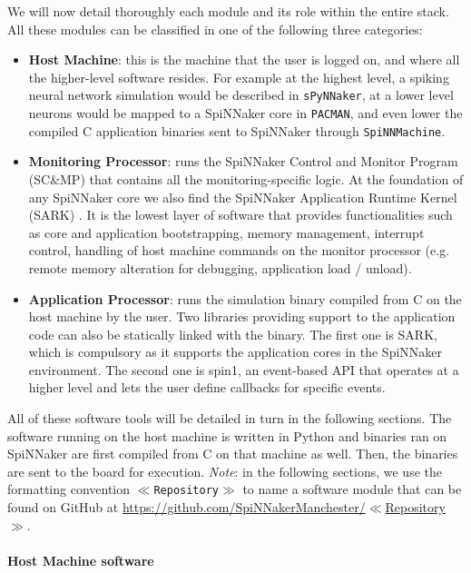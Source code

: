 We will now detail thoroughly each module and its role within the entire stack. All these modules can be classified in one of the following three categories:

\begin{itemize}
\item \textbf{Host Machine}: this is the machine that the user is logged on, and where all the higher-level software resides. For example at the highest level, a spiking neural network simulation would be described in \texttt{sPyNNaker}, at a lower level neurons would be mapped to a SpiNNaker core in \texttt{PACMAN}, and even lower the compiled C application binaries sent to SpiNNaker through \texttt{SpiNNMachine}.

\item \textbf{Monitoring Processor}: runs the SpiNNaker Control and Monitor Program (SC\&MP) \cite{spinnaker} that contains all the monitoring-specific logic. At the foundation of any SpiNNaker core we also find the SpiNNaker Application Runtime Kernel (SARK) \cite{sark}. It is the lowest layer of software that provides functionalities such as core and application bootstrapping, memory management, interrupt control, handling of host machine commands on the monitor processor (e.g. remote memory alteration for debugging, application load / unload).

\item \textbf{Application Processor}: runs the simulation binary compiled from C on the host machine by the user. Two libraries providing support to the application code can also be statically linked with the binary. The first one is SARK, which is compulsory as it supports the application cores in the SpiNNaker environment. The second one is spin1, an event-based API that operates at a higher level and lets the user define callbacks for specific events.
\end{itemize}

All of these software tools will be detailed in turn in the following sections. The software running on the host machine is written in Python and binaries ran on SpiNNaker are first compiled from C on that machine as well. Then, the binaries are sent to the board for execution. \textit{Note}: in the following sections, we use the formatting convention \texttt{$\ll$Repository$\gg$} to name a software module that can be found on GitHub at \href{https://github.com/SpiNNakerManchester}{https://github.com/SpiNNakerManchester/$\ll$Repository$\gg$}.

\paragraph{Host Machine software}

